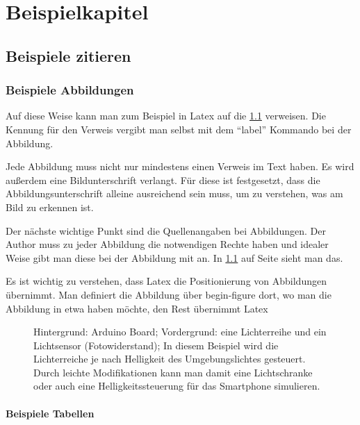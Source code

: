 \chapter{Beispielkapitel}
\section{Beispiele zitieren}

\cite{Spiel-Engine}

\subsection{Beispiele Abbildungen}
Auf diese Weise kann man zum Beispiel in Latex auf die \cref{fig:ArduExample} verweisen. Die Kennung für den Verweis vergibt
man selbst mit dem "`label"' Kommando bei der Abbildung.

Jede Abbildung muss nicht nur mindestens einen Verweis im Text haben. Es wird außerdem eine Bildunterschrift verlangt. Für diese ist festgesetzt, dass die Abbildungsunterschrift alleine ausreichend sein muss, um zu verstehen, was am Bild zu erkennen ist. 

Der nächste wichtige Punkt sind die Quellenangaben bei Abbildungen. Der Author muss zu jeder Abbildung die notwendigen Rechte haben und idealer Weise gibt man diese bei der Abbildung mit an. In \cref{fig:ArduExample} auf Seite \pageref{fig:ArduExample} sieht man das.

Es ist wichtig zu verstehen, dass Latex die Positionierung von Abbildungen übernimmt. Man definiert die Abbildung über begin-figure dort, wo man die Abbildung in etwa haben  möchte, den Rest übernimmt Latex

\begin{figure}[t]
\centering
\caption[Arduino mit Lichtsensor und Lichterkette]{Hintergrund: Arduino Board;
Vordergrund: eine Lichterreihe und ein Lichtsensor (Fotowiderstand); In diesem
Beispiel wird die Lichterreiche je nach Helligkeit des Umgebungslichtes
gesteuert. Durch leichte Modifikationen kann man damit eine Lichtschranke oder
auch eine Helligkeitssteuerung für das Smartphone simulieren.}
\label{fig:ArduExample}
\end{figure}

\subsubsection{Beispiele Tabellen}

